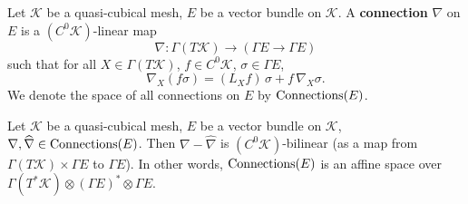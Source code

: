 \newcommand{\Connections}{\mathop{\rm Connections}\nolimits}
\begin{definition}
  Let
    $\mathcal{K}$ be a quasi-cubical mesh,
    $E$ be a vector bundle on $\mathcal{K}$.
  A \textbf{connection} $\nabla$ on $E$ is a $(C^0 \mathcal{K})$-linear map
  \begin{equation}
    \nabla \colon \Gamma(T \mathcal{K})  \to (\Gamma E \to \Gamma E)
  \end{equation}
  such that for all
  $X \in \Gamma(T \mathcal{K})$,
  $f \in C^0 \mathcal{K}$,
  $\sigma \in \Gamma E$,
  \begin{equation}
    \nabla_X (f \sigma) = (L_X f)\, \sigma + f\, \nabla_X \sigma.
  \end{equation}
  We denote the space of all connections on $E$ by $\Connections(E)$.
\end{definition}
\begin{proposition}
  Let
    $\mathcal{K}$ be a quasi-cubical mesh,
    $E$ be a vector bundle on $\mathcal{K}$,
    $\nabla, \widehat{\nabla} \in \Connections(E)$.
  Then $\nabla - \widehat{\nabla}$ is $(C^0 \mathcal{K})$-bilinear
  (as a map from $\Gamma(T \mathcal{K}) \times \Gamma E$ to $\Gamma E$).
  In other words, $\Connections(E)$ is an affine space over
  $\Gamma(T^* \mathcal{K}) \otimes (\Gamma E)^* \otimes \Gamma E$.
\end{proposition}
